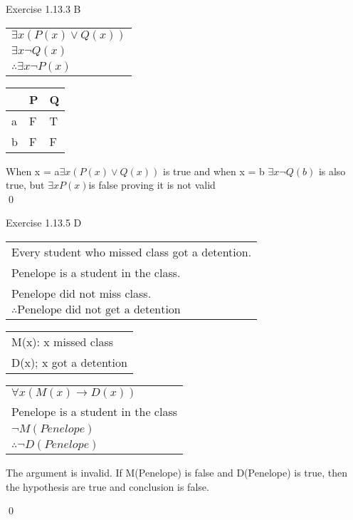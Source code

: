 \documentclass[11pt]{article}
\begin{document}
\noindent Exercise 1.13.3 B\\

\begin{center}
  \begin{tabular}{l}
  $\exists x (P(x) \vee Q(x))$\\
  $\exists x \neg Q(x)$\\
     \hline
  $ \therefore \exists x \neg P(x) $
 

  \end{tabular}
\end{center}

\begin{center}
\begin{tabular}{|l|l|l|}
\hline
 & P& Q \\ \hline
a & F & T \\ \hline
b & F & F \\ \hline
\end{tabular}
\end{center}

\noindent When x = a$\exists x (P(x) \vee Q(x))$ is true and when x = b $\exists x \neg Q(b)$ is also true, but $\exists xP(x)$is false proving it is not valid\\
\qed 
\newpage 

\noindent Exercise 1.13.5 D
\begin{center}
  \begin{tabular}{l}
  Every student who missed class got a detention.\\
  Penelope is a student in the class.\\
  Penelope did not miss class.\\
    \hline
  $ \therefore \text{Penelope did not get a detention}$
  \end{tabular}
  
  \begin{center}
\begin{tabular}{l}

M(x): x missed class\\
D(x); x got a detention\\
\end{tabular}
\end{center}

\begin{center}
\begin{tabular}{l}
$\forall x (M(x) \rightarrow D(x))$\\
Penelope is a student in the class\\
$\neg M(Penelope)$\\
\hline
$\therefore \neg D(Penelope)$\\
\end{tabular}
\end{center}

\noindent The argument is invalid. If M(Penelope) is false and D(Penelope) is true, then the hypothesis are true and conclusion is false.\\
\end{center}
\qed
\end{document}
